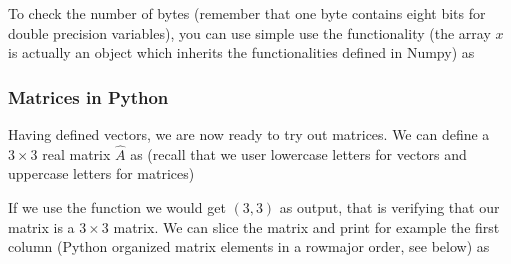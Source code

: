 \documentclass[letterpaper,10pt,english]{sphinxmanual}
\begin{document}
To check the number of bytes (remember that one byte contains eight bits for double precision variables), you can use simple use the  functionality (the array \(x\) is actually an object which inherits the functionalities defined in Numpy) as

\begin{sphinxVerbatim}[commandchars=\\\{\}]
   
  \PYG{p}{[}  \PYG{p}{]}
\end{sphinxVerbatim}


\subsubsection{Matrices in Python}
\label{\detokenize{chapter2:matrices-in-python}}
Having defined vectors, we are now ready to try out matrices. We can
define a \(3 \times 3 \) real matrix \(\hat{A}\) as (recall that we user
lowercase letters for vectors and uppercase letters for matrices)

\begin{sphinxVerbatim}[commandchars=\\\{\}]
   
  \PYG{p}{[} \PYG{p}{[}  \PYG{p}{]} \PYG{p}{[}  \PYG{p}{]} \PYG{p}{[}  \PYG{p}{]} \PYG{p}{]}
\end{sphinxVerbatim}

If we use the  function we would get \((3, 3)\) as output, that is verifying that our matrix is a \(3\times 3\) matrix. We can slice the matrix and print for example the first column (Python organized matrix elements in a row\sphinxhyphen{}major order, see below) as
\end{document}
